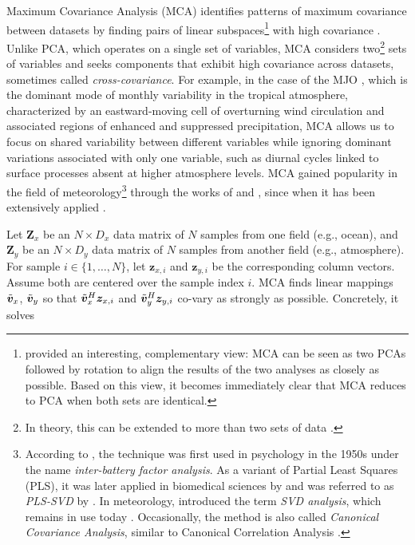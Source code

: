 Maximum Covariance Analysis (MCA) identifies patterns of maximum covariance between datasets by finding pairs of linear subspaces\footnote{\citet{cherry_comments_1997} provided an interesting, complementary view: MCA can be seen as two PCAs followed by rotation to align the results of the two analyses as closely as possible. Based on this view, it becomes immediately clear that MCA reduces to PCA when both sets are identical.} with high covariance \cite[e.g.][p. 321]{storch_statistical_1999}. Unlike PCA, which operates on a single set of variables, MCA considers two\footnote{In theory, this can be extended to more than two sets of data \cite{kettenring_canonical_1971}.} sets of variables and seeks components that exhibit high covariance across datasets, sometimes called \textit{cross-covariance}. For example, in the case of the MJO \cite{madden_detection_1971}, which is the dominant mode of monthly variability \cite[e.g.][]{corral_increased_2023} in the tropical atmosphere, characterized by an eastward-moving cell of overturning wind circulation and associated regions of enhanced and suppressed precipitation, MCA allows us to focus on shared variability between different variables while ignoring dominant variations associated with only one variable, such as diurnal cycles linked to surface processes absent at higher atmosphere levels. MCA gained popularity in the field of meteorology\footnote{According to \citet[][p. 225]{jolliffe_principal_2002}, the technique was first used in psychology in the 1950s under the name \textit{inter-battery factor analysis}. As a variant of Partial Least Squares (PLS), it was later applied in biomedical sciences by \citet{sampson_neurobehavioral_1989} and was referred to as \textit{PLS-SVD} by \citet{wegelin_survey_2000}. In meteorology, \citet{bretherton_intercomparison_1992} introduced the term \textit{SVD analysis}, which remains in use today \cite[e.g.][]{mori_reconciled_2019}. Occasionally, the method is also called \textit{Canonical Covariance Analysis}, similar to Canonical Correlation Analysis \cite[e.g.][]{cherry_singular_1996,hannachi_patterns_2021}.} through the works of \citet{bretherton_intercomparison_1992} and \citet{wallace_singular_1992}, since when it has been extensively applied \cite[e.g.][]{wallace_singular_1992,tsai_maximum_2009,li_north_2016,barreto_maximum_2017,mori_reconciled_2019,rathore_improving_2021}.

Let $\bm{Z}_x$ be an $N\times D_x$ data matrix of $N$ samples from one field (e.g., ocean), and $\bm{Z}_y$ be an $N \times D_y$ data matrix of $N$ samples from another field (e.g., atmosphere). For sample $i\in\{1, \dots, N\}$, let $\bm{z}_{x,i}$ and $\bm{z}_{y,i}$ be the corresponding column vectors. Assume both are centered over the sample index $i$. MCA finds linear mappings $\tilde{\bm{v}}_x$, $\tilde{\bm{v}}_y$ so that $\tilde{\bm{v}}_x^H \bm{z}_{x,i}$  and $\tilde{\bm{v}}_y^H \bm{z}_{y,i}$ co-vary as strongly as possible. Concretely, it solves

